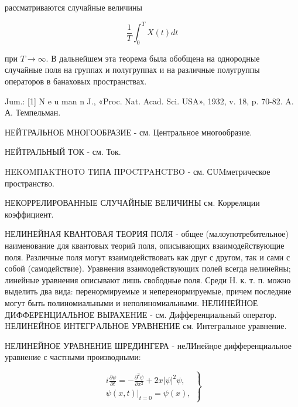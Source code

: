 \documentclass[10pt]{article}
\begin{document}
рассматриваются случайные величины



\[

\frac{1}{T} \int_{0}^{T} X(t) d t

\]



при $T \rightarrow \infty$. В дальнейшем эта теорема была обобщена на однородные случайные поля на группах и полугруппах и на различные полугруппы операторов в банаховых пространствах.



Jum.: [1] N e u man n J., «Proc. Nat. Acad. Sci. USA», 1932, v. 18, p. 70-82. A. А. Темпельман.



НЕЙTРАЛЬНОЕ МНОГООБРАЗИЕ - см. Центральное многообразие.



НЕЙТРАЛЬНЫЙ ТОК - см. Ток.



HEKOMПAKTHOТO TИПА ПPOCTPAHCTBO - см. СUMметрическое пространство.



НЕКОРРЕЛИРОВАННЫЕ СЛУЧАЙНЫЕ ВЕЛИЧИНЫ см. Корреляции коэффициент.



НЕЛИНЕЙНАЯ КВАНТОВАЯ ТЕОРИЯ ПОЛЯ - общее (малоупотребительное) наименование для квантовых теорий поля, описывающих взаимодействующие поля. Различные поля могут взаимодействовать как друг с другом, так и сами с собой (самодействие). Уравнения взаимодействующих полей всегда нелинейны; линейные уравнения описывают лишь свободные поля. Среди Н. к. т. п. можно выделить два вида: перенормируемые и неперенормируемые, причем последние могут быть полиномиальными и неполиномиальными. НЕЛИНЕЙНОЕ ДИФФЕРЕНЦИАЛЬНОЕ ВЫРАХЕHИЕ - см. Дифференциальный оператор. HЕЛИНЕЙНОЕ ИНТЕГPАЛЬНОЕ УРАВНЕНИЕ см. Интегральное уравнение.



НЕЛИНЕЙНОЕ УРАВНЕНИЕ ШРЕДИНГЕРА - неЛИнейңое дифференциальное уравнение с частными производными:



\[

\left.\begin{array}{l}

i \frac{\partial \psi}{\partial t}=-\frac{\partial^{2} \psi}{\partial x^{2}}+2 x|\psi|^{2} \psi, \\

\left.\psi(x, t)\right|_{t=0}=\psi(x),

\end{array}\right\}

\]
\end{document}
